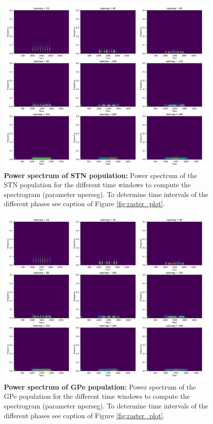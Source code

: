 \documentclass[11pt]{article}
\begin{document}
\begin{figure}[tb]
    \centering
    \includegraphics[width=\textwidth]{images/power_spectrum_STN.pdf}
    \caption{\textbf{Power spectrum of STN population:}
    Power spectrum of the STN population for the different time windows to 
    compute the spectrogram (parameter nperseg). 
    To determine time intervals of the different 
    phases see caption of Figure \ref{fig:raster_plot}.}
    \label{fig:power_spectrum_STN}
\end{figure}

\begin{figure}[tb]
    \centering
    \includegraphics[width=\textwidth]{images/power_spectrum_GPe.pdf}
    \caption{\textbf{Power spectrum of GPe population:} 
    Power spectrum of the GPe population for the different time windows to 
    compute the spectrogram (parameter nperseg). 
    To determine time intervals of the different 
    phases see caption of Figure \ref{fig:raster_plot}.}
    \label{fig:power_spectrum_GPe}
\end{figure}
\end{document}
